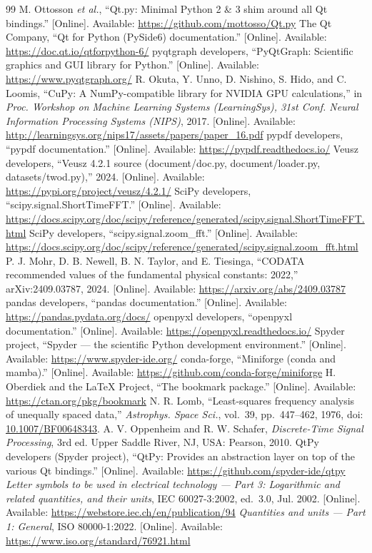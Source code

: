 \documentclass[10pt,letterpaper]{article}
\numberwithin{equation}{section}
\begin{document}
\begin{thebibliography}{99}
 M. Ottosson \emph{et al.}, ``Qt.py: Minimal Python 2 \& 3 shim around all Qt bindings.'' [Online]. Available: \url{https://github.com/mottosso/Qt.py}
 The Qt Company, ``Qt for Python (PySide6) documentation.'' [Online]. Available: \url{https://doc.qt.io/qtforpython-6/}
 pyqtgraph developers, ``PyQtGraph: Scientific graphics and GUI library for Python.'' [Online]. Available: \url{https://www.pyqtgraph.org/}
 R. Okuta, Y. Unno, D. Nishino, S. Hido, and C. Loomis, ``CuPy: A NumPy-compatible library for NVIDIA GPU calculations,'' in \emph{Proc. Workshop on Machine Learning Systems (LearningSys), 31st Conf. Neural Information Processing Systems (NIPS)}, 2017. [Online]. Available: \url{http://learningsys.org/nips17/assets/papers/paper_16.pdf}
 pypdf developers, ``pypdf documentation.'' [Online]. Available: \url{https://pypdf.readthedocs.io/}
 Veusz developers, ``Veusz 4.2.1 source (document/doc.py, document/loader.py, datasets/twod.py),'' 2024. [Online]. Available: \url{https://pypi.org/project/veusz/4.2.1/}
 SciPy developers, ``scipy.signal.ShortTimeFFT.'' [Online]. Available: \url{https://docs.scipy.org/doc/scipy/reference/generated/scipy.signal.ShortTimeFFT.html}
 SciPy developers, ``scipy.signal.zoom\_fft.'' [Online]. Available: \url{https://docs.scipy.org/doc/scipy/reference/generated/scipy.signal.zoom_fft.html}
 P. J. Mohr, D. B. Newell, B. N. Taylor, and E. Tiesinga, ``CODATA recommended values of the fundamental physical constants: 2022,'' arXiv:2409.03787, 2024. [Online]. Available: \url{https://arxiv.org/abs/2409.03787}
 pandas developers, ``pandas documentation.'' [Online]. Available: \url{https://pandas.pydata.org/docs/}
 openpyxl developers, ``openpyxl documentation.'' [Online]. Available: \url{https://openpyxl.readthedocs.io/}
 Spyder project, ``Spyder --- the scientific Python development environment.'' [Online]. Available: \url{https://www.spyder-ide.org/}
 conda-forge, ``Miniforge (conda and mamba).'' [Online]. Available: \url{https://github.com/conda-forge/miniforge}
 H. Oberdiek and the LaTeX Project, ``The bookmark package.'' [Online]. Available: \url{https://ctan.org/pkg/bookmark}
 N. R. Lomb, ``Least-squares frequency analysis of unequally spaced data,'' \emph{Astrophys. Space Sci.}, vol.~39, pp.~447--462, 1976, doi: \href{https://doi.org/10.1007/BF00648343}{10.1007/BF00648343}.
 A. V. Oppenheim and R. W. Schafer, \emph{Discrete-Time Signal Processing}, 3rd ed. Upper Saddle River, NJ, USA: Pearson, 2010.
 QtPy developers (Spyder project), ``QtPy: Provides an abstraction layer on top of the various Qt bindings.'' [Online]. Available: \url{https://github.com/spyder-ide/qtpy}
 \emph{Letter symbols to be used in electrical technology --- Part 3: Logarithmic and related quantities, and their units}, IEC 60027-3:2002, ed.~3.0, Jul. 2002. [Online]. Available: \url{https://webstore.iec.ch/en/publication/94}
 \emph{Quantities and units --- Part 1: General}, ISO 80000-1:2022. [Online]. Available: \url{https://www.iso.org/standard/76921.html}
\end{thebibliography}
\end{document}
